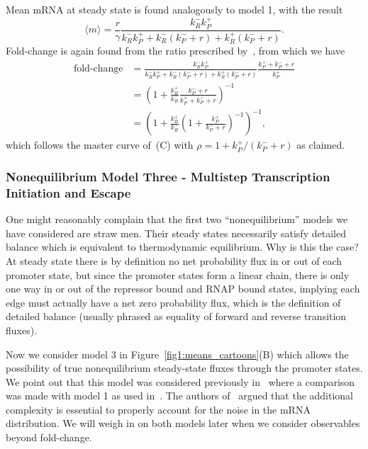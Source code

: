 Mean mRNA at steady state is found analogously to model 1, with the result
\begin{equation}
\langle m\rangle = \frac{r}{\gamma}
        \frac{k_R^- k_P^+}
        {k_R^- k_P^+ + k_R^- (k_P^- + r) + k_R^+ (k_P^- + r)}.
\end{equation}
Fold-change is again found from the ratio prescribed by~, from
which we have
\begin{align}
\text{fold-change}
&=      \frac{k_R^- k_P^+}
        {k_R^- k_P^+ + k_R^- (k_P^- + r) + k_R^+ (k_P^- + r)}
        \frac{k_P^+ + k_P^- + r}{k_P^+}
\\
&=      \left(1 + \frac{k_R^+}{k_R^-}
                \frac{k_P^- + r}{k_P^+ + k_P^- + r}
        \right)^{-1}
\\
&=      \left(1 + \frac{k_R^+}{k_R^-}
        \left(1 + \frac{k_P^+}{k_P^- + r}\right)^{-1}
        \right)^{-1},
\end{align}
which follows the master curve of~(C) with $\rho = 1 + k_P^+/(k_P^- + r)$ as claimed.

\subsubsection{Nonequilibrium Model Three - Multistep Transcription Initiation and
Escape}
 One might reasonably complain that the first two ``nonequilibrium''
models we have considered are straw men. Their steady states necessarily satisfy
detailed balance which is equivalent to thermodynamic equilibrium. Why is this
the case? At steady state there is by definition no net probability flux in or
out of each promoter state, but since the promoter states form a linear chain,
there is only one way in or out of the repressor bound and RNAP bound states,
implying each edge must actually have a net zero probability flux, which is the
definition of detailed balance (usually phrased as equality of forward and
reverse transition fluxes).

Now we consider model 3 in Figure~\ref{fig1:means_cartoons}(B) which allows the possibility
of true nonequilibrium steady-state fluxes through the promoter states. We point
out that this model was considered previously in~\cite{Mitarai2015} where a
comparison was made with model 1 as used in~\cite{Jones2014}. The authors
of~\cite{Mitarai2015} argued that the additional complexity is essential to
properly account for the noise in the mRNA distribution. We will weigh in on
both models later when we consider observables beyond fold-change.


